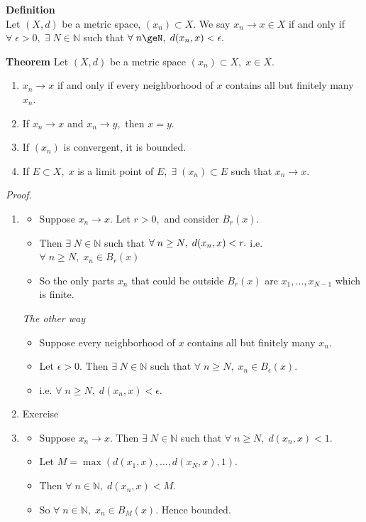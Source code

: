 \documentclass[12pt]{article}
\begin{document}
\newpage
\begin{block}{\bf Definition}\\
Let $(X,d)$ be a metric space, $(x_n)\subset X$. We say $x_n\to x \in X$ if and only if $\forall\;\epsilon>0,\;\exists\;N\in\mathbb{N}$ such that $\forall\;n\geN,\;d(x_n,x)<\epsilon.$

\vspace{1\baselineskip}
{\bf Theorem} Let $(X,d)$ be a metric space $(x_n)\subset X,\;x\in X$.
\begin{enumerate}[label=(\roman*)]
    \item $x_n\to x$ if and only if every neighborhood of $x$ contains all but finitely many $x_n$.
    \item If $x_n\to x$ and $x_n\to y,$ then $x=y$.
    \item If $(x_n)$ is convergent, it is bounded.
    \item If $E\subset X,\;x$ is a limit point of $E,\;\exists\;(x_n)\subset E$ such that $x_n\to x$.\\
\end{enumerate}

{\sl Proof.}
\begin{enumerate}[label=(\roman*)]
    \item 
    \begin{itemize}
        \item Suppose $x_n\to x.$ Let $r>0,$ and consider $B_r(x).$
        \item Then $\exists\;N\in\mathbb{N}$ such that $\forall\;n\ge N,\;d(x_n,x)<r.\hfill$ i.e. $\forall\;n\ge N,\;x_n\in B_r(x)$
        \item So the only parts $x_n$ that could be outside $B_r(x)$ are $x_1,\ldots,x_{N-1}$ which is finite.\\
    \end{itemize}
    {\sl The other way}
    \begin{itemize}
        \item Suppose every neighborhood of $x$ contains all but finitely many $x_n$.
        \item Let $\epsilon>0$. Then $\exists\;N\in\mathbb{N}$ such that $\forall\;n\ge N,\;x_n\in B_\epsilon(x).$ 
        \item i.e. $\forall\; n\ge N,\;d(x_n,x)<\epsilon$.
    \end{itemize}
    
    \item Exercise
    \item 
    \begin{itemize}
        \item Suppose $x_n\to x$. Then $\exists\;N\in\mathbb{N}$ such that $\forall\;n\ge N,\;d(x_n,x)<1$.
        \item Let $M=\max(d(x_1,x),\ldots,d(x_N,x), 1).$
        \item Then $\forall\;n\in\mathbb{N},\;d(x_n,x)<M.$
        \item So $\forall\;n\in\mathbb{N},\;x_n\in B_M(x)$. Hence bounded.
    \end{itemize}
    

\end{enumerate}
\end{block}
\end{document}
